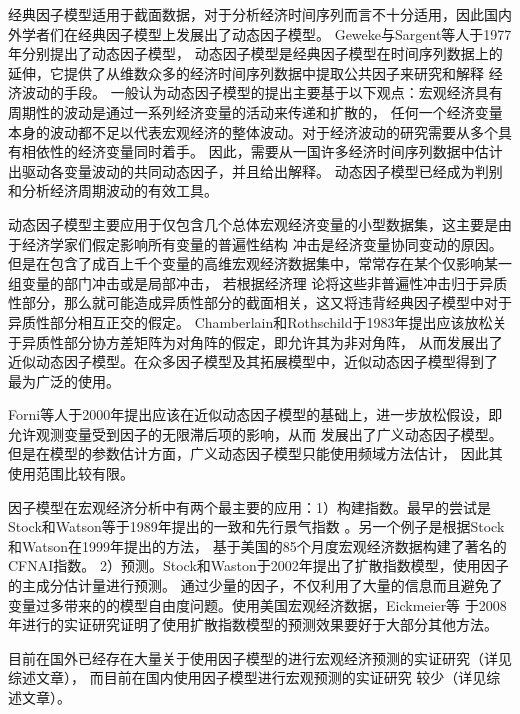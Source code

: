 经典因子模型适用于截面数据，对于分析经济时间序列而言不十分适用，因此国内外学者们在经典因子模型上发展出了动态因子模型。
Geweke\cite{geweke1977dynamic}与Sargent\cite{sargent1977business}等人于1977年分别提出了动态因子模型，
动态因子模型是经典因子模型在时间序列数据上的延伸，它提供了从维数众多的经济时间序列数据中提取公共因子来研究和解释
经济波动的手段。
一般认为动态因子模型的提出主要基于以下观点：宏观经济具有周期性的波动是通过一系列经济变量的活动来传递和扩散的，
任何一个经济变量本身的波动都不足以代表宏观经济的整体波动。对于经济波动的研究需要从多个具有相依性的经济变量同时着手。
因此，需要从一国许多经济时间序列数据中估计出驱动各变量波动的共同动态因子，并且给出解释。
动态因子模型已经成为判别和分析经济周期波动的有效工具。

动态因子模型主要应用于仅包含几个总体宏观经济变量的小型数据集，这主要是由于经济学家们假定影响所有变量的普遍性结构
冲击是经济变量协同变动的原因。但是在包含了成百上千个变量的高维宏观经济数据集中，常常存在某个仅影响某一组变量的部门冲击或是局部冲击，
若根据经济理 论将这些非普遍性冲击归于异质性部分，那么就可能造成异质性部分的截面相关，这又将违背经典因子模型中对于异质性部分相互正交的假定。
Chamberlain和Rothschild于1983年提出应该放松关于异质性部分协方差矩阵为对角阵的假定，即允许其为非对角阵，
从而发展出了近似动态因子模型\cite{chamberlain1982arbitrage}。在众多因子模型及其拓展模型中，近似动态因子模型得到了
最为广泛的使用。

Forni等人于2000年提出应该在近似动态因子模型的基础上，进一步放松假设，即允许观测变量受到因子的无限滞后项的影响，从而
发展出了广义动态因子模型\cite{forni2000generalized}。但是在模型的参数估计方面，广义动态因子模型只能使用频域方法估计，
因此其使用范围比较有限。

因子模型在宏观经济分析中有两个最主要的应用：1）构建指数。最早的尝试是Stock和Watson等于1989年提出的一致和先行景气指数
\cite{stock1989new}。另一个例子是根据Stock和Watson在1999年提出的方法\cite{chan1999dynamic}，
基于美国的85个月度宏观经济数据构建了著名的CFNAI指数。
2）预测。Stock和Waston于2002年提出了扩散指数模型\cite{stock2002macroeconomic}，使用因子的主成分估计量进行预测。
通过少量的因子，不仅利用了大量的信息而且避免了变量过多带来的的模型自由度问题。使用美国宏观经济数据，Eickmeier等
于2008年进行的实证研究\cite{eickmeier2008successful}证明了使用扩散指数模型的预测效果要好于大部分其他方法。

目前在国外已经存在大量关于使用因子模型的进行宏观经济预测的实证研究（详见综述文章\cite{luciani2014large}），
而目前在国内使用因子模型进行宏观预测的实证研究
较少（详见综述文章\cite{高华川2015动态因子模型及其应用研究综述}）。

